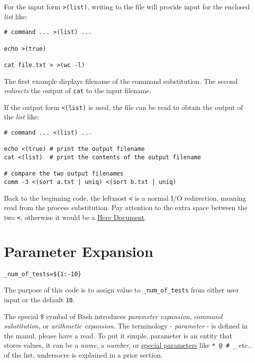 For the input form \lstinline|>(list)|, writing to the file will
provide input for the enclosed \textit{list} like:

\begin{lstlisting}
# command ... >(list) ...

echo >(true)

cat file.txt > >(wc -l)
\end{lstlisting}

The first example displays filename of the command
substitution. The second \textit{redirects} the output of
\lstinline|cat| to the input filename.

If the output form
\lstinline|<(list)| is used, the file can be read to obtain the
output of the \textit{list} like:

\begin{minipage}{1.0\linewidth}
\begin{lstlisting}
# command ... <(list) ...

echo <(true) # print the output filename
cat <(list)  # print the contents of the output filename

# compare the two output filenames
comm -3 <(sort a.txt | uniq) <(sort b.txt | uniq)
\end{lstlisting}
\end{minipage}

Back to the beginning code, the leftmost \verb|<| is a normal I/O
redirection, meaning read from the process substitution. Pay
attention to the extra space between the two \verb|<|, otherwise
it would be a
\href{https://www.gnu.org/software/bash/manual/bash.html#Here-Documents}{Here
  Document}.

\section{Parameter Expansion}
\label{sec:bash-parameter-expansion}

\begin{lstlisting}
_num_of_tests=${1:-10}
\end{lstlisting}

The purpose of this code is to assign value to
\verb|_num_of_tests| from either user input or the default
\verb|10|.

The special \$ symbol of Bash introduces \textit{parameter
  expansion}, \textit{command substitution}, or \textit{arithmetic
  expansion}. The terminology - \textit{parameter} - is defined in
the manul, please have a read. To put it simple, parameter is an
entity that stores values, it can be a \textit{name}, a
\textit{number}, or
\href{https://www.gnu.org/software/bash/manual/bash.html#Special-Parameters}{special
  parameters} like \verb|* @ # _| etc., of the list, undersocre is
explained in a prior section.

